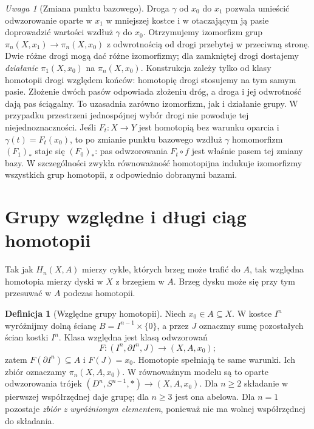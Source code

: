 \documentclass[11pt,a4paper,oneside]{report}
\theoremstyle{plain}
\theoremstyle{definition}
\newtheorem{definicja}[twierdzenie]{Definicja}
\theoremstyle{remark}
\newtheorem{uwaga}[twierdzenie]{Uwaga}
\begin{document}
\begin{uwaga}[Zmiana punktu bazowego]
Droga $\gamma$ od $x_0$ do $x_1$
pozwala umieścić odwzorowanie oparte w $x_1$
w mniejszej kostce i w otaczającym
ją pasie doprowadzić wartości
wzdłuż $\gamma$ do $x_0$.
Otrzymujemy izomorfizm grup
$\pi_n(X,x_1)\to\pi_n(X,x_0)$
z odwrotnością od drogi
przebytej w przeciwną stronę.
Dwie różne drogi mogą dać
różne izomorfizmy; dla zamkniętej
drogi dostajemy \emph{działanie}
$\pi_1(X,x_0)$ na $\pi_n(X,x_0)$.
Konstrukcja zależy tylko od klasy homotopii drogi względem końców:
homotopię drogi stosujemy na tym samym pasie. Złożenie dwóch pasów
odpowiada złożeniu dróg, a droga i jej odwrotność dają pas ściągalny.
To uzasadnia zarówno izomorfizm, jak i działanie grupy.
W przypadku przestrzeni jednospójnej wybór drogi
nie powoduje tej niejednoznaczności.
Jeśli $F_t:X\to Y$ jest homotopią bez warunku oparcia i
$\gamma(t)=F_t(x_0)$, to po zmianie punktu bazowego wzdłuż $\gamma$
homomorfizm $(F_1)_*$ staje się $(F_0)_*$: pas odwzorowania
$F_t\circ f$ jest właśnie pasem tej zmiany bazy.
W szczególności zwykła równoważność homotopijna indukuje
izomorfizmy wszystkich grup homotopii, z odpowiednio dobranymi bazami.
\end{uwaga}

\section{Grupy względne i długi ciąg homotopii}
\label{sec:pi-wzgledne}

Tak jak $H_n(X,A)$ mierzy cykle,
których brzeg może trafić do $A$,
tak względna homotopia mierzy
dyski w $X$ z brzegiem w $A$.
Brzeg dysku może się przy tym
przesuwać w $A$ podczas homotopii.

\begin{definicja}[Względne grupy homotopii]
\label{def:pi-wzgledne}
Niech $x_0\in A\subseteq X$.
W kostce $I^n$ wyróżnijmy
dolną ścianę $B=I^{n-1}\times\{0\}$,
a przez $J$ oznaczmy sumę
pozostałych ścian kostki $I^n$.
Klasa względna jest klasą odwzorowań
\[
 F:(I^n,\partial I^n,J)
       \longrightarrow(X,A,x_0);
\]
zatem $F(\partial I^n)\subseteq A$
i $F(J)=x_0$. Homotopie spełniają
te same warunki. Ich zbiór oznaczamy
$\pi_n(X,A,x_0)$.
W równoważnym modelu są to
oparte odwzorowania trójek
$(D^n,S^{n-1},*)\to(X,A,x_0)$.
Dla $n\geq2$ składanie w pierwszej
współrzędnej daje grupę; dla
$n\geq3$ jest ona abelowa.
Dla $n=1$ pozostaje \emph{zbiór
z wyróżnionym elementem},
ponieważ nie ma wolnej współrzędnej
do składania.
\end{definicja}
\end{document}
